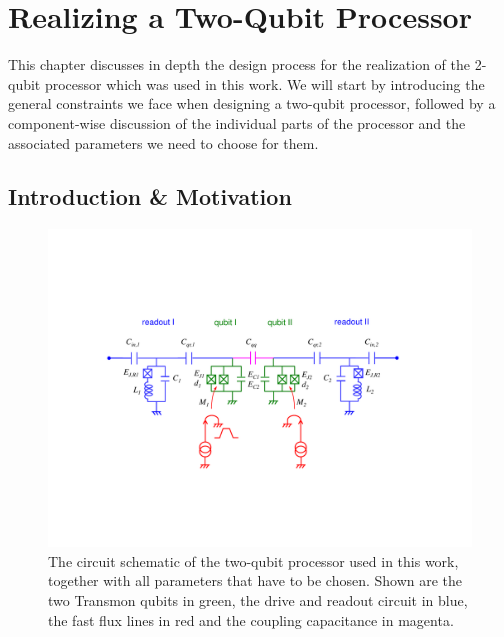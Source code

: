 \chapter{Realizing a Two-Qubit Processor} \label{chapter:design}

This chapter discusses in depth the design process for the realization of the 2-qubit processor which was used in this work. We will start by introducing the general constraints we face when designing a two-qubit processor, followed by a component-wise discussion of the individual parts of the processor and the associated parameters we need to choose for them.

\section{Introduction \& Motivation}

\begin{figure}[ht!]
  \centering
	\includegraphics[width=1.\textwidth]{"./material/figures/2-qubit-processor/processor_schematic_parameters"}
	\caption[Circuit schematic of the two-qubit processor]{The circuit schematic of the two-qubit processor used in this work, together with all parameters that have to be chosen. Shown are the two Transmon qubits in green, the drive and readout circuit in blue, the fast flux lines in red and the coupling capacitance in magenta.}
	\label{fig:2_qubit_chip_circuit_diagram}
\end{figure}

